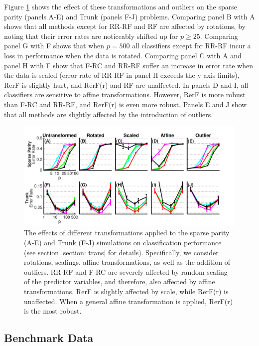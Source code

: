Figure \ref{transformations} shows the effect of these transformations and outliers on the sparse parity (panels A-E) and Trunk (panels F-J) problems. Comparing panel B with A shows that all methods except for RR-RF and RF are affected by rotations, by noting that their error rates are noticeably shifted up for $p \geq 25$. Comparing panel G with F shows that when $p = 500$ all classifiers except for RR-RF incur a loss in performance when the data is rotated. Comparing panel C with A and panel H with F show that F-RC and RR-RF suffer an increase in error rate when the data is  scaled (error rate of RR-RF in panel H exceeds the y-axis limits), RerF is slightly hurt, and RerF(r) and RF are unaffected. In panels D and I, all classifiers are sensitive to affine transformations. However, RerF is more robust than F-RC and RR-RF, and RerF(r) is even more robust. Panels E and J show that all methods are slightly affected by the introduction of outliers. 

\begin{figure}[ht]
\vskip 0.2in
\begin{center}
\centerline{\includegraphics[width=\columnwidth]{Fig3_transformations2}}
\caption{The effects of different transformations applied to the sparse parity (A-E) and Trunk (F-J) simulations on classification performance (see section \ref{section: trans} for details). Specifically, we consider rotations, scalings, affine transformations, as well as the addition of outliers. RR-RF and F-RC are severely affected by random scaling of the predictor variables, and therefore, also affected by affine transformations. RerF is slightly affected by scale, while RerF(r) is unaffected. When a general affine transformation is applied, RerF(r) is the most robust.}
\label{transformations}
\end{center}
\vskip -0.2in
\end{figure}

\subsection{Benchmark Data}
\label{section: benchmark}

